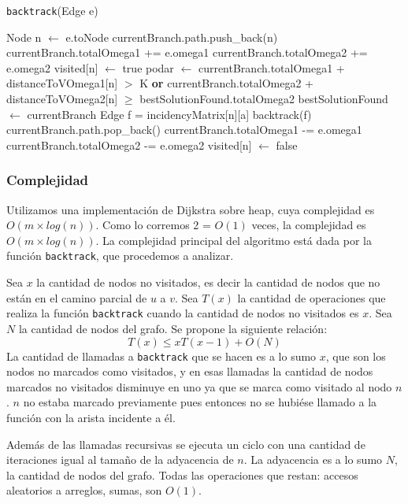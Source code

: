 \begin{algorithm}[H]
    \caption{\texttt{backtrack}(Edge e)}
\begin{algorithmic}[1]
  \State Node n $\leftarrow$ e.toNode
  \State currentBranch.path.push\_back(n)
  \State currentBranch.totalOmega1 += e.omega1
  \State currentBranch.totalOmega2 += e.omega2
  \State visited[n] $\leftarrow$ true
  \State podar $\leftarrow$ currentBranch.totalOmega1 + distanceToVOmega1[n] $>$ K \textbf{or} currentBranch.totalOmega2 + distanceToVOmega2[n] $\geq$ bestSolutionFound.totalOmega2
      \State bestSolutionFound $\leftarrow$ currentBranch
  \Else{}
          \State Edge f = incidencyMatrix[n][a]
          \State backtrack(f)
	\EndIf
      \EndFor
  \EndIf
  \EndIf
  \State currentBranch.path.pop\_back()
  \State currentBranch.totalOmega1 -= e.omega1
  \State currentBranch.totalOmega2 -= e.omega2
  \State visited[n] $\leftarrow$ false
\end{algorithmic}
\end{algorithm}

\subsubsection{Complejidad}

Utilizamos una implementación de Dijkstra sobre heap, cuya complejidad es $O(m \times log(n))$. Como lo corremos 2 = $O(1)$ veces, la complejidad es $O(m \times log(n))$. La complejidad principal del algoritmo está dada por la función \texttt{backtrack}, que procedemos a analizar.

Sea $x$ la cantidad de nodos no visitados, es decir la cantidad de nodos que no están en el camino parcial de $u$ a $v$. Sea $T(x)$ la cantidad de operaciones que realiza la función \texttt{backtrack} cuando la cantidad de nodos no visitados es $x$. Sea $N$ la cantidad de nodos del grafo. Se propone la siguiente relación:
\[
    T(x) \leq x T(x-1) + O(N)
\]
La cantidad de llamadas a \texttt{backtrack} que se hacen es a lo sumo $x$, que son los nodos no marcados como visitados, y en esas llamadas la cantidad de nodos marcados no visitados disminuye en uno ya que se marca como visitado al nodo $n$. $n$ no estaba marcado previamente pues entonces no se hubiése llamado a la función con la arista incidente a él.

Además de las llamadas recursivas se ejecuta un ciclo con una cantidad de iteraciones igual al tamaño de la adyacencia de $n$. La adyacencia es a lo sumo $N$, la cantidad de nodos del grafo. Todas las operaciones que restan: accesos aleatorios a arreglos, sumas, son $O(1)$.

